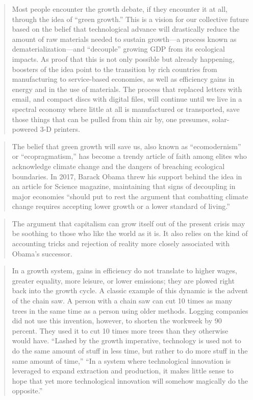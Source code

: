 \documentclass[
]{book}
\begin{document}
\begin{quote}
Most people encounter the growth debate, if they encounter it at all, through the idea of ``green growth.'' This is a vision for our collective future based on the belief that technological advance will drastically reduce the amount of raw materials needed to sustain growth---a process known as dematerialization---and ``decouple'' growing GDP from its ecological impacts. As proof that this is not only possible but already happening, boosters of the idea point to the transition by rich countries from manufacturing to service-based economies, as well as efficiency gains in energy and in the use of materials. The process that replaced letters with email, and compact discs with digital files, will continue until we live in a spectral economy where little at all is manufactured or transported, save those things that can be pulled from thin air by, one presumes, solar-powered 3-D printers.
\end{quote}

\begin{quote}
The belief that green growth will save us, also known as ``ecomodernism'' or ``ecopragmatism,'' has become a trendy article of faith among elites who acknowledge climate change and the dangers of breaching ecological boundaries. In 2017, Barack Obama threw his support behind the idea in an article for Science magazine, maintaining that signs of decoupling in major economies ``should put to rest the argument that combatting climate change requires accepting lower growth or a lower standard of living.''
\end{quote}

\begin{quote}
The argument that capitalism can grow itself out of the present crisis may be soothing to those who like the world as it is. It also relies on the kind of accounting tricks and rejection of reality more closely associated with Obama's successor.
\end{quote}

\begin{quote}
In a growth system, gains in efficiency do not translate to higher wages, greater equality, more leisure, or lower emissions; they are plowed right back into the growth cycle. A classic example of this dynamic is the advent of the chain saw. A person with a chain saw can cut 10 times as many trees in the same time as a person using older methods. Logging companies did not use this invention, however, to shorten the workweek by 90 percent. They used it to cut 10 times more trees than they otherwise would have. ``Lashed by the growth imperative, technology is used not to do the same amount of stuff in less time, but rather to do more stuff in the same amount of time,''
``In a system where technological innovation is leveraged to expand extraction and production, it makes little sense to hope that yet more technological innovation will somehow magically do the opposite.''
\end{quote}
\end{document}
